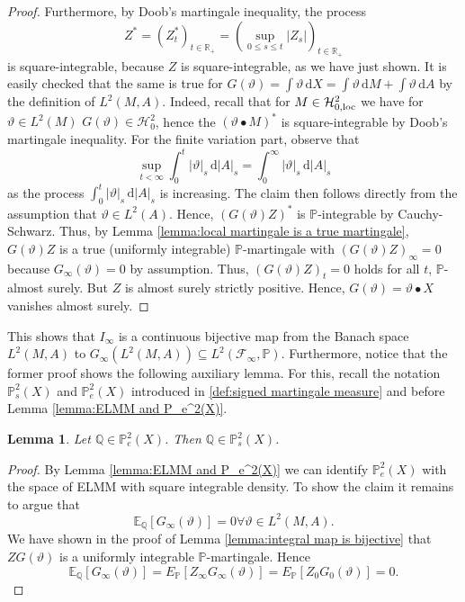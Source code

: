 \documentclass[11pt,a4paper,twoside,openany]{report}
\numberwithin{equation}{section}
\newcommand{\diff}{\mathrm{d}}
\theoremstyle{plain} %
\newtheorem{lemma}[theorem]{Lemma}
\theoremstyle{definition} %
\theoremstyle{remark} %
\begin{document}
\begin{proof}
          Furthermore, by Doob's martingale inequality, the process
          \begin{equation*}
              Z^*=(Z^*_t)_{t\in\mathbb{R}_+}=(\sup_{0\leq s\leq t}|Z_s|)_{t\in\mathbb{R}_+}
          \end{equation*}
          is square-integrable, because \(Z\) is square-integrable, as we have just shown. It is easily checked that the same is true for \(G(\vartheta)=\int\vartheta\,\diff X=\int\vartheta\,\diff M+\int\vartheta\,\diff A\) by the definition of \(L^2(M,A)\). Indeed, recall that for \(M\in\mathcal{H}_{0,\rm{loc}}^2\) we have for \(\vartheta\in L^2(M)\) \(G(\vartheta)\in\mathcal{H}^2_0\), hence the \((\vartheta\bullet M)^*\) is square-integrable by Doob's martingale inequality. For the finite variation part, observe that
          \begin{equation*}
              \sup_{t<\infty}\int_0^t|\vartheta|_s\,\diff |A|_s=\int_0^\infty|\vartheta|_s\,\diff |A|_s
          \end{equation*}
          as the process \(\int_0^t|\vartheta|_s\,\diff |A|_s\) is increasing. The claim then follows directly from the assumption that \(\vartheta\in L^2(A)\). Hence, \((G(\vartheta)Z)^*\) is \(\mathbb{P}\)-integrable by Cauchy-Schwarz. Thus, by Lemma \ref{lemma:local martingale is a true martingale}, \(G(\vartheta)Z\) is a true (uniformly integrable) \(\mathbb{P}\)-martingale with \((G(\vartheta)Z)_{\infty}=0\) because \(G_{\infty}(\vartheta)=0\) by assumption. Thus, \((G(\vartheta)Z)_t=0\) holds for all \(t\), \(\mathbb{P}\)-almost surely. But \(Z\) is almost surely strictly positive. Hence, \(G(\vartheta)=\vartheta\bullet X\) vanishes almost surely.
\end{proof}
This shows that \(I_{\infty}\) is a continuous bijective map from the Banach space \(L^2(M,A)\) to \(G_{\infty}(L^2(M,A))\subseteq L^2(\mathcal{F}_{\infty},\mathbb{P})\). 
Furthermore, notice that the former proof shows the following auxiliary lemma. For this, recall the notation \(\mathbb{P}_s^2(X)\) and \(\mathbb{P}_e^2(X)\) introduced in \ref{def:signed martingale measure} and before Lemma \ref{lemma:ELMM and P_e^2(X)}.
\begin{lemma}\label{lemma:P_s(Theta) in P_e(X)}
Let \(\mathbb{Q}\in \mathbb{P}_e^2(X)\). Then \(\mathbb{Q}
\in\mathbb{P}_s^2(X)\).
\end{lemma}
\begin{proof}
    By Lemma \ref{lemma:ELMM and P_e^2(X)} we can identify \(\mathbb{P}_e^2(X)\) with the space of ELMM with square integrable density. To show the claim it remains to argue that \begin{equation*}
        \mathbb{E}_{\mathbb{Q}}[G_{\infty}(\vartheta)]=0\forall \vartheta\in L^2(M,A).
    \end{equation*}
    We have shown in the proof of Lemma \ref{lemma:integral map is bijective} that \(ZG(\vartheta)\) is a uniformly integrable \(\mathbb{P}\)-martingale. Hence 
    \begin{equation*}
        \mathbb{E}_{\mathbb{Q}}[G_{\infty}(\vartheta)]=E_{\mathbb{P}}[Z_{\infty}G_{\infty}(\vartheta)]=E_{\mathbb{P}}[Z_{0}G_{0}(\vartheta)]=0.
    \end{equation*}
\end{proof}
\end{document}

